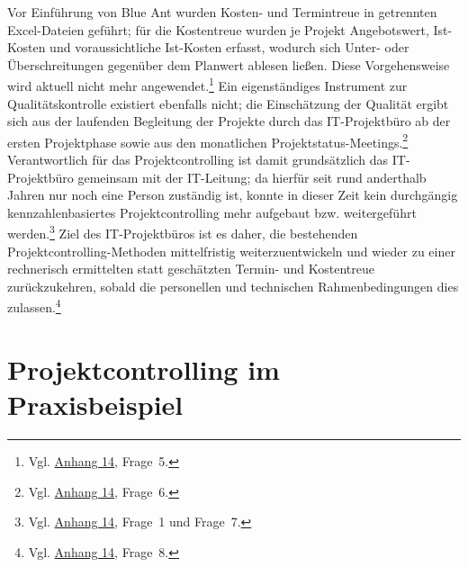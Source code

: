 \documentclass[
    12pt, 
    a4paper,
    ]{scrartcl} %
\begin{document}
Vor Einführung von Blue Ant wurden Kosten- und Termintreue in getrennten Excel-Dateien geführt; für die Kostentreue wurden je Projekt Angebotswert, Ist-Kosten und voraussichtliche Ist-Kosten erfasst, wodurch sich Unter- oder Überschreitungen gegenüber dem Planwert ablesen ließen. Diese Vorgehensweise wird aktuell nicht mehr angewendet.\footnote{Vgl. \hyperref[sec:Anhang14]{Anhang 14}, Frage~5.} Ein eigenständiges Instrument zur Qualitätskontrolle existiert ebenfalls nicht; die Einschätzung der Qualität ergibt sich aus der laufenden Begleitung der Projekte durch das IT-Projektbüro ab der ersten Projektphase sowie aus den monatlichen Projektstatus-Meetings.\footnote{Vgl. \hyperref[sec:Anhang14]{Anhang 14}, Frage~6.} Verantwortlich für das Projektcontrolling ist damit grundsätzlich das IT-Projektbüro gemeinsam mit der IT-Leitung; da hierfür seit rund anderthalb Jahren nur noch eine Person zuständig ist, konnte in dieser Zeit kein durchgängig kennzahlenbasiertes Projektcontrolling mehr aufgebaut bzw. weitergeführt werden.\footnote{Vgl. \hyperref[sec:Anhang14]{Anhang 14}, Frage~1 und Frage~7.} Ziel des IT-Projektbüros ist es daher, die bestehenden Projektcontrolling-Methoden mittelfristig weiterzuentwickeln und wieder zu einer rechnerisch ermittelten statt geschätzten Termin- und Kostentreue zurückzukehren, sobald die personellen und technischen Rahmenbedingungen dies zulassen.\footnote{Vgl. \hyperref[sec:Anhang14]{Anhang 14}, Frage~8.}

\section{Projektcontrolling im Praxisbeispiel}
\end{document}
